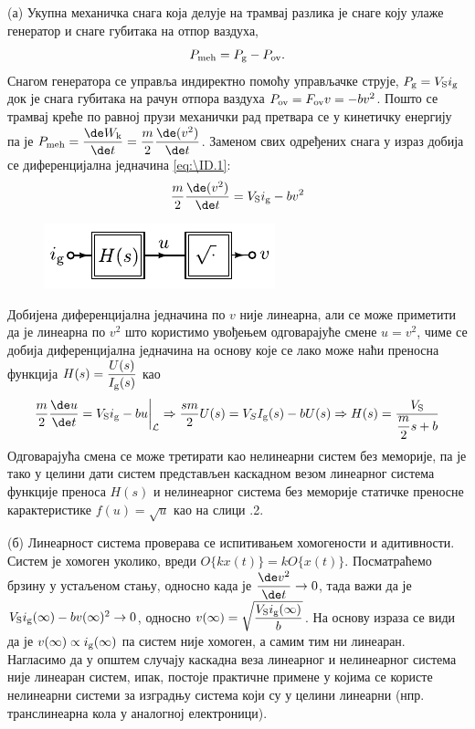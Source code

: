 \RESENJE  (а) Укупна механичка снага која делује на трамвај разлика је снаге 
коју улаже генератор и снаге губитака на отпор ваздуха, 
\begin{equation}
P_{\rm meh} = P_{\rm g} - P_{\rm ov}. \label{eq:\ID.1}
\end{equation}
Снагом генератора се управља индиректно помоћу управљачке
струје, $P_{\rm g} = V_{\rm S} i_{\rm g}$ док је снага губитака на рачун отпора ваздуха 
$P_{\rm ov } = F_{\rm ov} v = -bv^2$. Пошто се трамвај креће по равној прузи механички рад 
претвара се у кинетичку енергију па је
$P_{\rm meh} = \dfrac{\de W_{\rm k}}{\de t} = \dfrac{m}{2} \dfrac{\de (v^2)}{\de t}$. Заменом 
свих одређених снага у израз добија се диференцијална једначина \eqref{eq:\ID.1}:
\begin{equation}
    \dfrac{m}{2} \dfrac{\de (v^2)}{\de t} =
    V_{\rm S} i_{\rm g} - bv^2
\end{equation}
%
\begin{figure}[b!]
    \centering
    \includegraphics[scale=1]{fig/tram_diag.pdf}
    \caption{}
\end{figure}
%
Добијена диференцијална једначина по $v$ није линеарна, али се може приметити да је линеарна по $v^2$ што 
користимо увођењем одговарајуће смене $u = v^2$, чиме се добија диференцијална једначина  
на основу које се лако може наћи преносна функција $H(s) = \dfrac{U(s)}{I_{\rm g}(s)}$ \vspace*{1mm} као 
\begin{equation}
    \dfrac{m}{2} \dfrac{\de u}{\de t} =
    V_{\rm S} i_{\rm g} - bu \bigg|_{\mathcal L} \Rightarrow
    \dfrac{sm}{2} U(s) = V_S I_{\rm g}(s) - b U(s) \Rightarrow 
    H(s) = \dfrac{V_{\rm S}}{ \dfrac{m}{2} s + b }
\end{equation}
Одговарајућа смена се може третирати као нелинеарни систем без меморије, па је тако у целини 
дати систем представљен каскадном везом линеарног система функције преноса $H(s)$ и нелинеарног система
без меморије статичке преносне карактеристике $f(u) = \sqrt{u}$ као на слици \ID.2.

(б) Линеарност система проверава се испитивањем хомогености и адитивности. Систем је хомоген уколико, вреди 
$O\{kx(t)\} = kO\{x(t)\}$. Посматраћемо брзину у устаљеном стању, односно када је 
$\dfrac{\de v^2}{\de t} \to 0$, тада важи да је $V_{\rm S} i_{\rm g}(\infty) - bv(\infty)^2 \to 0$, односно 
$v(\infty) = \sqrt{\dfrac{V_{\rm S} i_{\rm g}(\infty)}{b}}$. На основу израза се види да је 
$v(\infty) \propto i_{\rm g}(\infty)$ па систем није хомоген, а самим тим ни линеаран. 
Нагласимо да у општем случају каскадна веза линеарног 
и нелинеарног система није линеаран систем, ипак, постоје практичне примене у којима се користе нелинеарни системи за изградњу система
који су у целини линеарни (нпр. транслинеарна кола у аналогној електроници).


